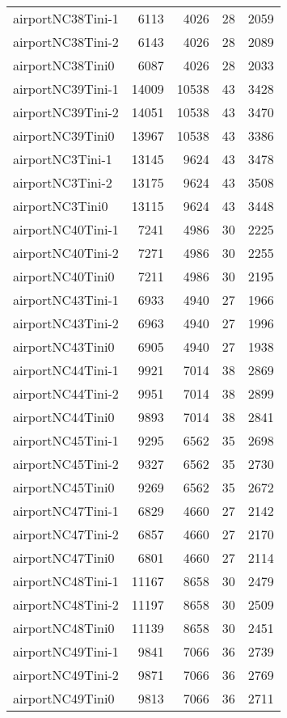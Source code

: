 \begin{tabular}{lrrrr}
airportNC38Tini-1 & 6113 & 4026 & 28 & 2059 \\
airportNC38Tini-2 & 6143 & 4026 & 28 & 2089 \\
airportNC38Tini0 & 6087 & 4026 & 28 & 2033 \\
airportNC39Tini-1 & 14009 & 10538 & 43 & 3428 \\
airportNC39Tini-2 & 14051 & 10538 & 43 & 3470 \\
airportNC39Tini0 & 13967 & 10538 & 43 & 3386 \\
airportNC3Tini-1 & 13145 & 9624 & 43 & 3478 \\
airportNC3Tini-2 & 13175 & 9624 & 43 & 3508 \\
airportNC3Tini0 & 13115 & 9624 & 43 & 3448 \\
airportNC40Tini-1 & 7241 & 4986 & 30 & 2225 \\
airportNC40Tini-2 & 7271 & 4986 & 30 & 2255 \\
airportNC40Tini0 & 7211 & 4986 & 30 & 2195 \\
airportNC43Tini-1 & 6933 & 4940 & 27 & 1966 \\
airportNC43Tini-2 & 6963 & 4940 & 27 & 1996 \\
airportNC43Tini0 & 6905 & 4940 & 27 & 1938 \\
airportNC44Tini-1 & 9921 & 7014 & 38 & 2869 \\
airportNC44Tini-2 & 9951 & 7014 & 38 & 2899 \\
airportNC44Tini0 & 9893 & 7014 & 38 & 2841 \\
airportNC45Tini-1 & 9295 & 6562 & 35 & 2698 \\
airportNC45Tini-2 & 9327 & 6562 & 35 & 2730 \\
airportNC45Tini0 & 9269 & 6562 & 35 & 2672 \\
airportNC47Tini-1 & 6829 & 4660 & 27 & 2142 \\
airportNC47Tini-2 & 6857 & 4660 & 27 & 2170 \\
airportNC47Tini0 & 6801 & 4660 & 27 & 2114 \\
airportNC48Tini-1 & 11167 & 8658 & 30 & 2479 \\
airportNC48Tini-2 & 11197 & 8658 & 30 & 2509 \\
airportNC48Tini0 & 11139 & 8658 & 30 & 2451 \\
airportNC49Tini-1 & 9841 & 7066 & 36 & 2739 \\
airportNC49Tini-2 & 9871 & 7066 & 36 & 2769 \\
airportNC49Tini0 & 9813 & 7066 & 36 & 2711 \\

\end{tabular}
